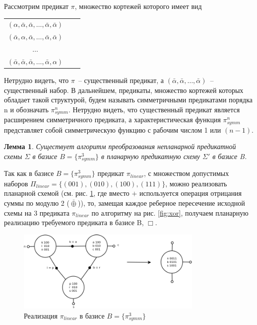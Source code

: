 \documentclass[12pt]{extarticle}
\newtheorem{lemma}[theorem]{Лемма}
\newenvironment{proof}[1][Доказательство.]{\begin{trivlist}
\item[\hskip \labelsep {\bfseries #1}]}{\end{trivlist}}
\newenvironment{definition}[1][Определение.]{\begin{trivlist}
\item[\hskip \labelsep {\bfseries #1}]}{\end{trivlist}}
\begin{document}
\begin{definition}
Рассмотрим предикат 
$\pi$, множество кортежей которого имеет вид
\begin{center}
\begin{tabular}{ccc}
$(\alpha, \bar{\alpha}, \bar{\alpha}, \dots, \bar{\alpha}, \bar{\alpha})$\\
$(\bar{\alpha}, \alpha, \bar{\alpha}, \dots, \bar{\alpha}, \bar{\alpha})$\\
$\ldots$\\
$(\bar{\alpha}, \bar{\alpha}, \bar{\alpha}, \dots, \bar{\alpha}, \alpha)$
\end{tabular}
\end{center}

Нетрудно видеть, что $\pi$~-- существенный предикат, а
$(\bar{\alpha}, \bar{\alpha}, \dots, \bar{\alpha})$~-- существенный набор. 
В дальнейшем, предикаты, множество кортежей которых обладает такой структурой, будем называть 
симметричными предикатами порядка n и обозначать $\pi_{symm}^n$. Нетрудно видеть, что существенный предикат является 
расширением симметричного предиката, а характеристическая функция $\pi_{symm}^n$ представляет собой симметрическую функцию
с рабочим числом 1 или $(n-1)$.
\end{definition}

\begin{lemma}
\label{eq:planar_algo}
Существует алгоритм преобразования непланарной предикатной схемы $\Sigma$ в базисе $B=\{\pi_{symm}^3\}$
в планарную предикатную схему $\Sigma'$ в базисе B.
\end{lemma}
\begin{proof}
Так как в базисе $B=\{\pi_{symm}^3\}$ предикат 
$\pi_{linear}$, с множеством допустимых наборов $\Pi_{linear} = \{ (001), (010), (100), (111) \}$, 
можно реализовать планарной схемой (см. рис. \ref{fig:linear_3}, где вместо $+$ используется операция
отрицания суммы по модулю 2 ($\bar{\oplus}$)), то, замещая каждое реберное пересечение исходной схемы
на 3 предиката $\pi_{linear}$ по алгоритму на рис. \ref{fig:xor}, получаем планарную реализацию требуемого предиката
в базисе B, $\Box$.
\end{proof}

\begin{figure}[htb]
\centering
\includegraphics[width=0.8\textwidth]{linear.png}
\caption{Реализация $\pi_{linear}$ в базисе $B = \{ \pi_{symm}^3 \}$}
\label{fig:linear_3}
\end{figure}
\end{document}
